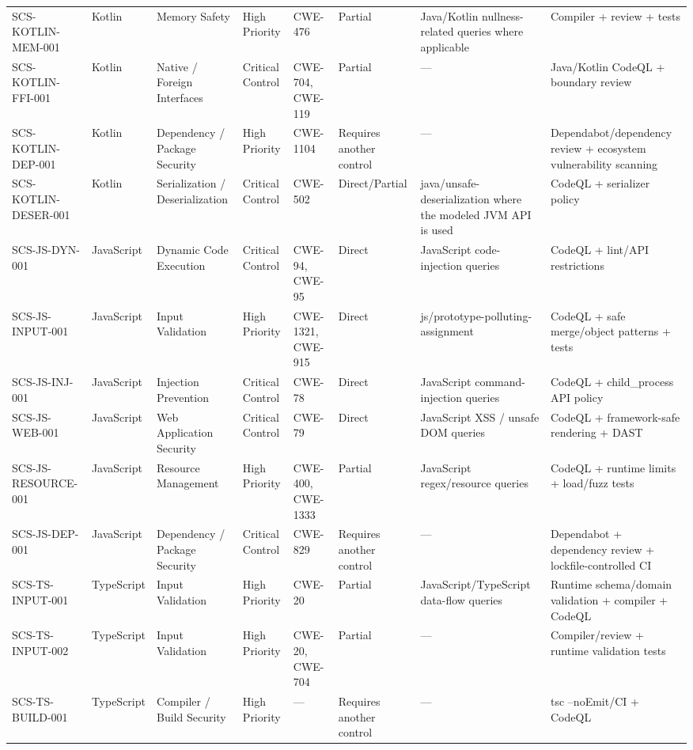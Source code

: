 \documentclass[10pt,letterpaper]{article}
\begin{document}
\begin{landscape}
\begin{longtable}{@{}P{1.0in}P{0.6in}P{0.95in}P{0.75in}P{0.85in}P{0.75in}P{2.0in}P{2.05in}@{}}
SCS-KOTLIN-MEM-001 & Kotlin & Memory Safety & High Priority & CWE-476 & Partial & Java/Kotlin nullness-related queries where applicable & Compiler + review + tests\\
SCS-KOTLIN-FFI-001 & Kotlin & Native / Foreign Interfaces & Critical Control & CWE-704, CWE-119 & Partial & --- & Java/Kotlin CodeQL + boundary review\\
SCS-KOTLIN-DEP-001 & Kotlin & Dependency / Package Security & High Priority & CWE-1104 & Requires another control & --- & Dependabot/dependency review + ecosystem vulnerability scanning\\
SCS-KOTLIN-DESER-001 & Kotlin & Serialization / Deserialization & Critical Control & CWE-502 & Direct/Partial & java/unsafe-deserialization where the modeled JVM API is used & CodeQL + serializer policy\\
SCS-JS-DYN-001 & JavaScript & Dynamic Code Execution & Critical Control & CWE-94, CWE-95 & Direct & JavaScript code-injection queries & CodeQL + lint/API restrictions\\
SCS-JS-INPUT-001 & JavaScript & Input Validation & High Priority & CWE-1321, CWE-915 & Direct & js/prototype-polluting-assignment & CodeQL + safe merge/object patterns + tests\\
SCS-JS-INJ-001 & JavaScript & Injection Prevention & Critical Control & CWE-78 & Direct & JavaScript command-injection queries & CodeQL + child\_process API policy\\
SCS-JS-WEB-001 & JavaScript & Web Application Security & Critical Control & CWE-79 & Direct & JavaScript XSS / unsafe DOM queries & CodeQL + framework-safe rendering + DAST\\
SCS-JS-RESOURCE-001 & JavaScript & Resource Management & High Priority & CWE-400, CWE-1333 & Partial & JavaScript regex/resource queries & CodeQL + runtime limits + load/fuzz tests\\
SCS-JS-DEP-001 & JavaScript & Dependency / Package Security & Critical Control & CWE-829 & Requires another control & --- & Dependabot + dependency review + lockfile-controlled CI\\
SCS-TS-INPUT-001 & TypeScript & Input Validation & High Priority & CWE-20 & Partial & JavaScript/TypeScript data-flow queries & Runtime schema/domain validation + compiler + CodeQL\\
SCS-TS-INPUT-002 & TypeScript & Input Validation & High Priority & CWE-20, CWE-704 & Partial & --- & Compiler/review + runtime validation tests\\
SCS-TS-BUILD-001 & TypeScript & Compiler / Build Security & High Priority & --- & Requires another control & --- & tsc --noEmit/CI + CodeQL\\

\end{longtable}
\end{landscape}
\end{document}
